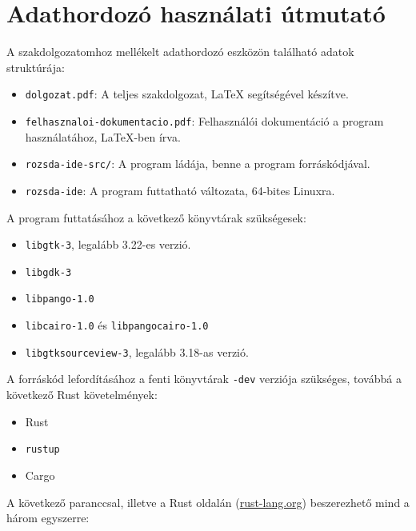 \chapter*{Adathordozó használati útmutató}



\noindent A szakdolgozatomhoz mellékelt adathordozó eszközön található adatok struktúrája:

\begin{itemize}
    \item \texttt{dolgozat.pdf}: A teljes szakdolgozat, \LaTeX{} segítségével készítve.
    \item \texttt{felhasznaloi-dokumentacio.pdf}: Felhasználói dokumentáció a program használatához, \LaTeX{}-ben írva.
    \item \texttt{rozsda-ide-src/}: A program ládája, benne a program forráskódjával.
    \item \texttt{rozsda-ide}: A program futtatható változata, 64-bites Linuxra.
\end{itemize}

\noindent A program futtatásához a következő könyvtárak szükségesek:

\begin{itemize}
    \item \texttt{libgtk-3}, legalább 3.22-es verzió.
    \item \texttt{libgdk-3}
    \item \texttt{libpango-1.0}
    \item \texttt{libcairo-1.0} és \texttt{libpangocairo-1.0}
    \item \texttt{libgtksourceview-3}, legalább 3.18-as verzió.
\end{itemize}

\noindent A forráskód lefordításához a fenti könyvtárak \texttt{-dev} verziója szükséges,
továbbá a következő Rust követelmények:

\begin{itemize}
    \item Rust
    \item \texttt{rustup}
    \item Cargo
\end{itemize}

\noindent A következő paranccsal, illetve a Rust oldalán (\url{rust-lang.org})
beszerezhető mind a három egyszerre: 